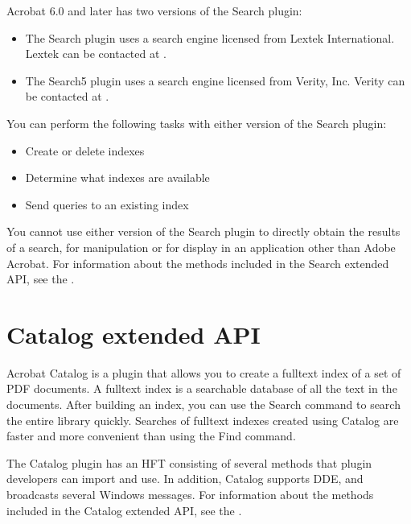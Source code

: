\documentclass[letterpaper,12pt,english,openany,oneside]{sphinxmanual}
\begin{document}
Acrobat 6.0 and later has two versions of the Search plugin:
\begin{itemize}
\item {} 
The Search plugin uses a search engine licensed from Lextek International. Lextek can be contacted at .

\item {} 
The Search5 plugin uses a search engine licensed from Verity, Inc. Verity can be contacted at .

\end{itemize}

You can perform the following tasks with either version of the Search plugin:
\begin{itemize}
\item {} 
Create or delete indexes

\item {} 
Determine what indexes are available

\item {} 
Send queries to an existing index

\end{itemize}

You cannot use either version of the Search plugin to directly obtain the results of a search, for manipulation or for display in an application other than Adobe Acrobat. For information about the methods included in the Search extended API, see the .


\section{Catalog extended API}
\label{\detokenize{Plugins_ExtendedAPI:catalog-extended-api}}
Acrobat Catalog is a plugin that allows you to create a full\sphinxhyphen{}text index of a set of PDF documents. A full\sphinxhyphen{}text index is a searchable database of all the text in the documents. After building an index, you can use the Search command to search the entire library quickly. Searches of full\sphinxhyphen{}text indexes created using Catalog are faster and more convenient than using the Find command.

The Catalog plugin has an HFT consisting of several methods that plugin developers can import and use. In addition, Catalog supports DDE, and broadcasts several Windows messages. For information about the methods included in the Catalog extended API, see the .
\end{document}
